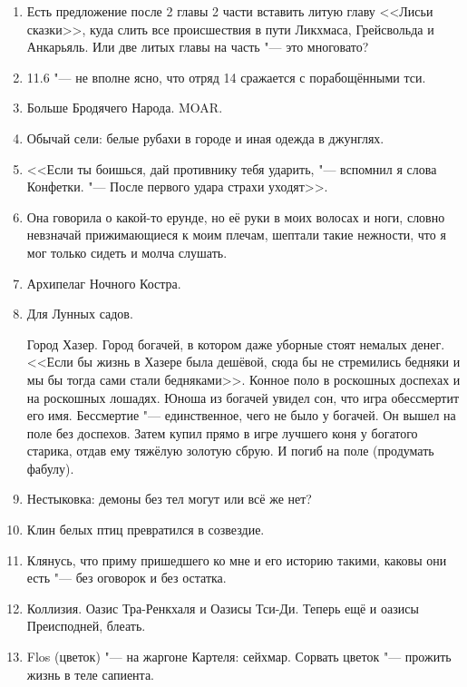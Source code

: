 \documentclass[a4paper,10pt]{book}
\begin{document}
\begin{enumerate}
\item Есть предложение после 2 главы 2 части вставить литую главу <<Лисьи сказки>>, куда слить все происшествия в пути Ликхмаса, Грейсвольда и Анкарьяль. Или две литых главы на часть "--- это многовато?

\item 11.6 "--- не вполне ясно, что отряд 14 сражается с порабощёнными тси.

\item Больше Бродячего Народа. MOAR.

\item Обычай сели: белые рубахи в городе и иная одежда в джунглях.

\item <<Если ты боишься, дай противнику тебя ударить, "--- вспомнил я слова Конфетки. "--- После первого удара страхи уходят>>.

\item Она говорила о какой-то ерунде, но её руки в моих волосах и ноги, словно невзначай прижимающиеся к моим плечам, шептали такие нежности, что я мог только сидеть и молча слушать.

\item Архипелаг Ночного Костра.

\item Для Лунных садов.

Город Хазер. Город богачей, в котором даже уборные стоят немалых денег. <<Если бы жизнь в Хазере была дешёвой, сюда бы не стремились бедняки и мы бы тогда сами стали бедняками>>. Конное поло в роскошных доспехах и на роскошных лошадях. Юноша из богачей увидел сон, что игра обессмертит его имя. Бессмертие "--- единственное, чего не было у богачей. Он вышел на поле без доспехов. Затем купил прямо в игре лучшего коня у богатого старика, отдав ему тяжёлую золотую сбрую. И погиб на поле (продумать фабулу).

\item Нестыковка: демоны без тел могут или всё же нет?

\item Клин белых птиц превратился в созвездие.

\item Клянусь, что приму пришедшего ко мне и его историю такими, каковы они есть "--- без оговорок и без остатка.

\item Коллизия. Оазис Тра-Ренкхаля и Оазисы Тси-Ди. Теперь ещё и оазисы Преисподней, блеать.

\item Flos (цветок) "--- на жаргоне Картеля: сейхмар. Сорвать цветок "--- прожить жизнь в теле сапиента.


\end{enumerate}
\end{document}
